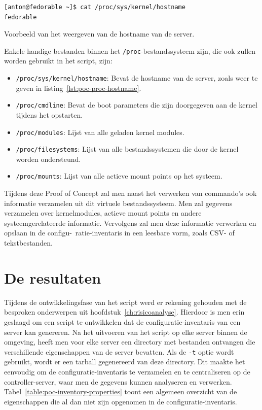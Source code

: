 \begin{listing}
  \begin{verbatim}
[anton@fedorable ~]$ cat /proc/sys/kernel/hostname
fedorable
  \end{verbatim}
  \caption[Weergave van server hostname.]{Voorbeeld van het weergeven van de hostname van de server.}
  \label{lst:poc-proc-hostname}
\end{listing}

Enkele handige bestanden binnen het \texttt{/proc}-bestandssysteem zijn, die ook zullen worden gebruikt in het script, zijn:

\begin{itemize}
    \item \texttt{/proc/sys/kernel/hostname}: Bevat de hostname van de server, zoals weer te geven in listing~\ref{lst:poc-proc-hostname}.
    \item \texttt{/proc/cmdline}: Bevat de boot parameters die zijn doorgegeven aan de kernel tijdens het opstarten.
    \item \texttt{/proc/modules}: Lijst van alle geladen kernel modules.
    \item \texttt{/proc/filesystems}: Lijst van alle bestandssystemen die door de kernel worden ondersteund.
    \item \texttt{/proc/mounts}: Lijst van alle actieve mount points op het systeem.
\end{itemize}

Tijdens deze Proof of Concept zal men naast het verwerken van commando's ook informatie verzamelen uit dit virtuele bestandssysteem.
Men zal gegevens verzamelen over kernelmodules, actieve mount points en andere systeemgerelateerde informatie.
Vervolgens zal men deze informatie verwerken en opslaan in de configu-\ ratie-inventaris in een leesbare vorm, zoals CSV- of tekstbestanden.

\section{De resultaten}
\label{poc_resultaten}

Tijdens de ontwikkelingsfase van het script werd er rekening gehouden met de besproken onderwerpen uit hoofdstuk~\ref{ch:risicoanalyse}.
Hierdoor is men erin geslaagd om een script te ontwikkelen dat de configuratie-inventaris van een server kan genereren.
Na het uitvoeren van het script op elke server binnen de omgeving, heeft men voor elke server een directory met bestanden ontvangen die verschillende eigenschappen van de server bevatten.
Als de \texttt{-t} optie wordt gebruikt, wordt er een tarball gegenereerd van deze directory.
Dit maakte het eenvoudig om de configuratie-inventaris te verzamelen en te centraliseren op de controller-server, waar men de gegevens kunnen analyseren en verwerken.
Tabel~\ref{table:poc-inventory-properties} toont een algemeen overzicht van de eigenschappen die al dan niet zijn opgenomen in de configuratie-inventaris.

